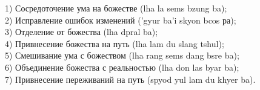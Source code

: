 \ru
{}


1)  Сосредоточение ума на божестве (lha la sems bzung ba);\\
2)  Исправление ошибок изменений ('gyur ba'i skyon bcos ра);\\
3)  Отделение от божества (lha dpral ba);\\
4)  Привнесение божества на путь (lha lam du slang tshul);\\
5)  Смешивание ума с божеством (lha rang sems dang bsre ba);\\
6)  Объединение божества с реальностью (lha don las byar ba);\\
7)  Привнесение переживаний на путь (spyod yul lam du khyer ba).\\


